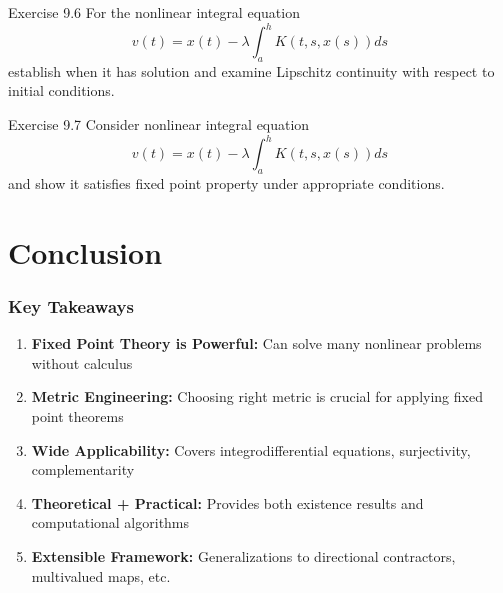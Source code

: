 \documentclass[aspectratio=169,10pt]{beamer}
\begin{document}
\begin{frame}[allowframebreaks]
    \begin{block}{Exercise 9.6}
        For the nonlinear integral equation
        \[
        v(t) = x(t) - \lambda \int_a^h K(t,s,x(s))ds
        \]
        establish when it has solution and examine Lipschitz continuity with respect to initial conditions.
    \end{block}

    \begin{block}{Exercise 9.7}
        Consider nonlinear integral equation
        \[
        v(t) = x(t) - \lambda \int_a^h K(t,s,x(s))ds
        \]
        and show it satisfies fixed point property under appropriate conditions.
    \end{block}
\end{frame}

\section{Conclusion}

\begin{frame}
    \frametitle{Key Takeaways}

    \begin{enumerate}
        \item \textbf{Fixed Point Theory is Powerful:} Can solve many nonlinear problems without calculus

        \item \textbf{Metric Engineering:} Choosing right metric is crucial for applying fixed point theorems

        \item \textbf{Wide Applicability:} Covers integrodifferential equations, surjectivity, complementarity

        \item \textbf{Theoretical + Practical:} Provides both existence results and computational algorithms

        \item \textbf{Extensible Framework:} Generalizations to directional contractors, multivalued maps, etc.
    \end{enumerate}
\end{frame}
\end{document}
